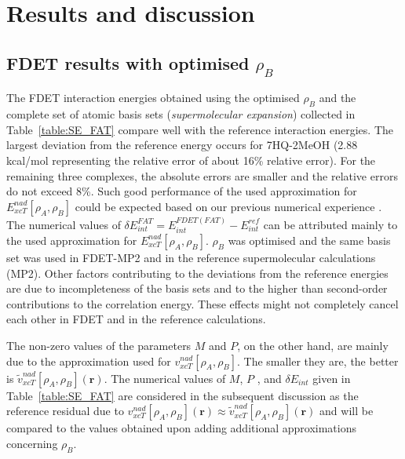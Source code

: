 \documentclass[amsmath,amssymb,preprint,aip,jcp]{revtex4-1}
\begin{document}
\section{Results and discussion}
\subsection{FDET results with optimised $\rho_B$}
The FDET interaction energies obtained using the optimised $\rho_B$ and the complete set of atomic basis sets ({\it supermolecular expansion}) collected in Table~\ref{table:SE_FAT} compare well with the reference interaction energies. 
The largest deviation from the reference energy occurs for 7HQ-2MeOH (2.88 kcal/mol representing the relative error of about 16\% relative error). 
For the remaining three complexes, the absolute errors are smaller and the relative errors do not exceed 8\%.
Such good performance of the used approximation for $E_{xcT}^{nad}[\rho_A,\rho_B]$
could be expected based on our previous numerical experience \cite{Wesolowski2003a,Kevorkyants2006,Dulak2007a}. The numerical values of $
\delta E_{int}^{FAT}=E^{FDET(FAT)}_{int}-E_{int}^{ref}\label{eq:def_err_en}$
 can be attributed mainly to the used approximation for $E_{xcT}^{nad}[\rho_A,\rho_B]$. 
 $\rho_B$ was optimised and the same basis set was used in FDET-MP2 and in the reference supermolecular calculations (MP2). 
Other factors contributing to the deviations from the reference energies are due to incompleteness of the basis sets and to the higher than second-order contributions to the correlation energy. These effects might not completely cancel each other in FDET and in the reference calculations. 

The non-zero values of the parameters $M$ and $P$, on the other hand, are mainly due to the approximation used for $v_{xcT}^{nad}[\rho_A,\rho_B]$. 
The smaller they are, the better is $\tilde{v}_{xcT}^{nad}[\rho_A,\rho_B](\mathbf{r})$.
The numerical values of $M$, $P$ , and $\delta E_{int}$ given in Table~\ref{table:SE_FAT} are considered in the subsequent discussion as the reference residual due to ${v}_{xcT}^{nad}[\rho_A,\rho_B](\mathbf{r})\approx\tilde{v}_{xcT}^{nad}[\rho_A,\rho_B](\mathbf{r})$ and will be compared to the values obtained upon adding additional approximations concerning $\rho_B$.
\end{document}
